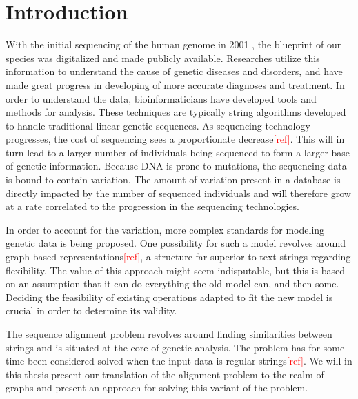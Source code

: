 \documentclass[thesis.tex]{subfiles}
\begin{document}
\chapter{Introduction}
With the initial sequencing of the human genome in 2001 \cite{human_genome}, the blueprint of our species was digitalized and made publicly available. Researches utilize this information to understand the cause of genetic diseases and disorders, and have made great progress in developing of more accurate diagnoses and treatment. In order to understand the data, bioinformaticians have developed tools and methods for analysis. These techniques are typically string algorithms developed to handle traditional linear genetic sequences. As sequencing technology progresses, the cost of sequencing sees a proportionate decrease\textcolor{red}{[ref]}. This will in turn lead to a larger number of individuals being sequenced to form a larger base of genetic information. Because DNA is prone to mutations, the sequencing data is bound to contain variation. The amount of variation present in a database is directly impacted by the number of sequenced individuals and will therefore grow at a rate correlated to the progression in the sequencing technologies.\\
\par\noindent
In order to account for the variation, more complex standards for modeling genetic data is being proposed. One possibility for such a model revolves around graph based representations\textcolor{red}{[ref]}, a structure far superior to text strings regarding flexibility. The value of this approach might seem indisputable, but this is based on an assumption that it can do everything the old model can, and then some. Deciding the feasibility of existing operations adapted to fit the new model is crucial in order to determine its validity.\\
\par\noindent
The sequence alignment problem revolves around finding similarities between strings and is situated at the core of genetic analysis. The problem has for some time been considered solved when the input data is regular strings\textcolor{red}{[ref]}. We will in this thesis present our translation of the alignment problem to the realm of graphs and present an approach for solving this variant of the problem.
\end{document}
